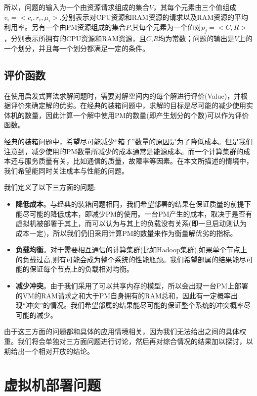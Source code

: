所以，问题的输入为一个由资源请求组成的集合$V$，其每个元素由三个值组成$v_i = <c_i,r_i,\mu_i>$,分别表示对CPU资源和RAM资源的请求以及RAM资源的平均利用率。另有一个由PM资源组成的集合$P$,其每个元素为一个值对$p_j = <C,R>$，分别表示所拥有的CPU资源和RAM资源，且$C$,$R$均为常数；问题的输出是$V$上的一个划分，并且每一个划分都满足一定的条件。

\subsection{评价函数}
\label{sec:value-function}

在使用启发式算法求解问题时，需要对解空间内的每个解进行评价(Value)，并根据评价来确定解的优劣。在经典的装箱问题中，求解的目标是尽可能的减少使用实体机的数量，因此计算一个解中使用PM的数量(即产生划分的个数)可以作为评价函数。

经典的装箱问题中，希望尽可能减少``箱子''数量的原因是为了降低成本。但是我们注意到，减少使用的PM数量所减少的成本通常是能源成本。而一个计算集群的成本还与服务质量有关，比如通信的质量，故障率等因素。在本文所描述的情境中，我们希望能同时关注成本与性能的问题。

我们定义了以下三方面的问题:

\begin{itemize}
\item \textbf{降低成本}。与经典的装箱问题相同，我们希望部署的结果在保证质量的前提下能尽可能的降低成本，即减少PM的使用。一台PM产生的成本，取决于是否有虚拟机被部署于其上，而可以认为与其上的负载没有关系(即一旦启动则认为成本一定)，所以我们仍旧采用计算PM的数量来作为衡量解优劣的指标。
\item \textbf{负载均衡}。对于需要相互通信的计算集群(比如Hadoop集群),如果单个节点上的负载过高,则有可能会成为整个系统的性能瓶颈。我们希望部属的结果能尽可能的保证每个节点上的负载相对均衡。
\item \textbf{减少冲突}。由于我们采用了可以共享内存的模型，所以会出现一台PM上部署的VM的RAM请求之和大于PM自身拥有的RAM总和，因此有一定概率出现``冲突''的情况。我们希望部属的结果能尽可能的保证整个系统的冲突概率尽可能的减少。
\end{itemize}

由于这三方面的问题都和具体的应用情境相关，因为我们无法给出之间的具体权重。我们将会单独对三方面问题进行讨论，然后再对综合情况的结果加以探讨，以期给出一个相对开放的结论。

\section{虚拟机部署问题}
\label{sec:formulation}

